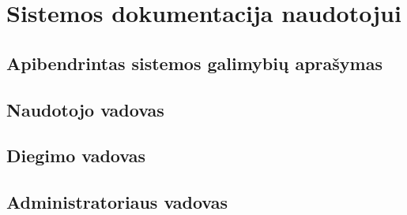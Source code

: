 \section{Sistemos dokumentacija naudotojui}

\subsection{Apibendrintas sistemos galimybių aprašymas}

\lipsum[1]

\subsection{Naudotojo vadovas}

\lipsum[2]

\subsection{Diegimo vadovas}

\lipsum[3]

\subsection{Administratoriaus vadovas}

\lipsum[4]

